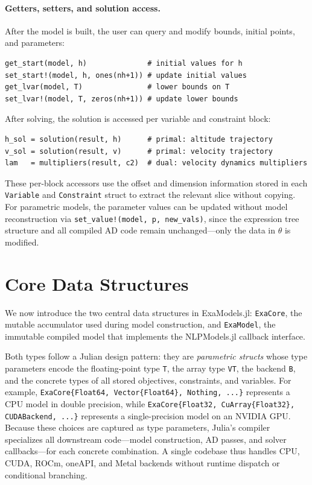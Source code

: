 \documentclass[11pt]{article}
\begin{document}
\paragraph{Getters, setters, and solution access.}
After the model is built, the user can query and modify bounds, initial points, and parameters:
\begin{lstlisting}
get_start(model, h)              # initial values for h
set_start!(model, h, ones(nh+1)) # update initial values
get_lvar(model, T)               # lower bounds on T
set_lvar!(model, T, zeros(nh+1)) # update lower bounds
\end{lstlisting}
After solving, the solution is accessed per variable and constraint block:
\begin{lstlisting}
h_sol = solution(result, h)      # primal: altitude trajectory
v_sol = solution(result, v)      # primal: velocity trajectory
lam   = multipliers(result, c2)  # dual: velocity dynamics multipliers
\end{lstlisting}
These per-block accessors use the offset and dimension information stored in each \texttt{Variable} and \texttt{Constraint} struct to extract the relevant slice without copying. For parametric models, the parameter values can be updated without model reconstruction via \texttt{set\_value!(model, p, new\_vals)}, since the expression tree structure and all compiled AD code remain unchanged---only the data in $\theta$ is modified.

\section{Core Data Structures}
\label{sec:data}


We now introduce the two central data structures in ExaModels.jl: \texttt{ExaCore}, the mutable accumulator used during model construction, and \texttt{ExaModel}, the immutable compiled model that implements the NLPModels.jl callback interface.

Both types follow a Julian design pattern: they are \emph{parametric structs} whose type parameters encode the floating-point type \texttt{T}, the array type \texttt{VT}, the backend \texttt{B}, and the concrete types of all stored objectives, constraints, and variables. For example, \texttt{ExaCore\{Float64, Vector\{Float64\}, Nothing, ...\}} represents a CPU model in double precision, while \texttt{ExaCore\{Float32, CuArray\{Float32\}, CUDABackend, ...\}} represents a single-precision model on an NVIDIA GPU. Because these choices are captured as type parameters, Julia's compiler specializes all downstream code---model construction, AD passes, and solver callbacks---for each concrete combination. A single codebase thus handles CPU, CUDA, ROCm, oneAPI, and Metal backends without runtime dispatch or conditional branching.
\end{document}
